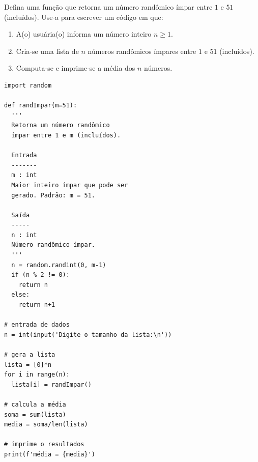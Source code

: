 \begin{exer}
  Defina uma função que retorna um número randômico ímpar entre $1$ e $51$ (incluídos). Use-a para escrever um código em que:
  \begin{enumerate}[1.]
  \item A(o) usuária(o) informa um número inteiro $n\geq 1$.
  \item Cria-se uma lista de $n$ números randômicos ímpares entre $1$ e $51$ (incluídos).
  \item Computa-se e imprime-se a média dos $n$ números.
  \end{enumerate}
\end{exer}
\begin{resp}

\begin{lstlisting}
import random

def randImpar(m=51):
  '''
  Retorna um número randômico
  ímpar entre 1 e m (incluídos).

  Entrada
  -------
  m : int
  Maior inteiro ímpar que pode ser 
  gerado. Padrão: m = 51.

  Saída
  -----
  n : int
  Número randômico ímpar.
  '''
  n = random.randint(0, m-1)
  if (n % 2 != 0):
    return n
  else:
    return n+1

# entrada de dados
n = int(input('Digite o tamanho da lista:\n'))

# gera a lista
lista = [0]*n
for i in range(n):
  lista[i] = randImpar()

# calcula a média
soma = sum(lista)
media = soma/len(lista)

# imprime o resultados
print(f'média = {media}')
\end{lstlisting}

\end{resp}

